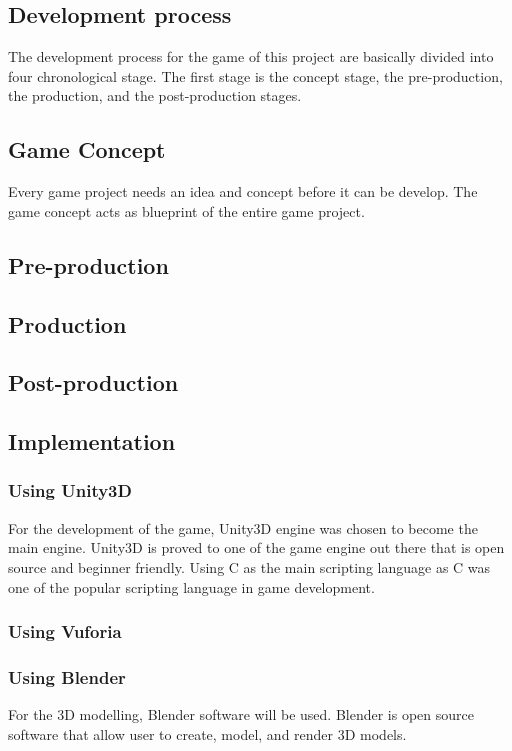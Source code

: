 \documentclass[12pt]{article}
\begin{document}
\subsection{Development process}
The development process for the game of this project are basically divided into four chronological stage. The first stage is the concept stage, the pre-production, the production, and the post-production stages. 
\subsection{Game Concept}

Every game project needs an idea and concept before it can be develop. The game concept acts as blueprint of the entire game project.

\subsection{Pre-production}

\subsection{Production}
\subsection{Post-production}
\subsection{Implementation}
\subsubsection{Using Unity3D}
For the development of the  game, Unity3D engine was chosen to become the main engine. Unity3D is proved to one of the game engine out there that is open source and beginner friendly. Using C as the main scripting language as C was one of the popular scripting language in game development. 
\subsubsection{Using Vuforia}
\subsubsection{Using Blender}
For the 3D modelling, Blender software will be used. Blender is open source software that allow user to create, model, and render 3D models. 
\end{document}
